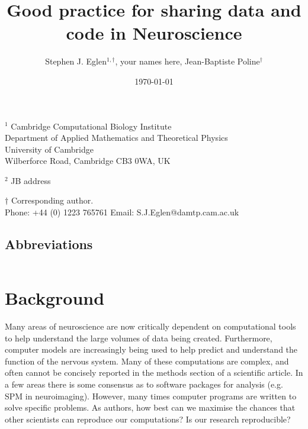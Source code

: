 \documentclass[11pt]{article}
\begin{document}
\doublespacing

\title{Good practice for sharing data and code in Neuroscience}

\author{Stephen J. Eglen$^{1,\dagger}$, your names here, Jean-Baptiste Poline${^\dagger}$}
\date{\today}
\maketitle

\noindent $^{1}$ 
Cambridge Computational Biology Institute\\
Department of Applied Mathematics and Theoretical Physics\\
University of Cambridge\\
Wilberforce Road, Cambridge CB3 0WA, UK
\vspace*{2mm}

\noindent $^2$ JB address

\vspace*{2mm}


\noindent $\dagger$
Corresponding author.\\
\noindent Phone: +44 (0) 1223 765761
\noindent Email: S.J.Eglen@damtp.cam.ac.uk



\vspace*{2cm}
\subsection*{Abbreviations}
\begin{tabular}{ll}
\end{tabular}


\clearpage


\renewcommand{\cite}[1]{\autocite{#1}}

\linenumbers

\section*{Background}

Many areas of neuroscience are now critically dependent on
computational tools to help understand the large volumes of data being
created.  Furthermore, computer models are increasingly being used to
help predict and understand the function of the nervous system.  Many
of these computations are complex, and often cannot be concisely
reported in the methods section of a scientific article.  In a few
areas there is some consensus as to software packages for analysis
(e.g. SPM in neuroimaging).  However, many times computer programs are
written to solve specific problems.  As authors, how best can we
maximise the chances that other scientists can reproduce our
computations?  Is our research reproducible?
\end{document}
